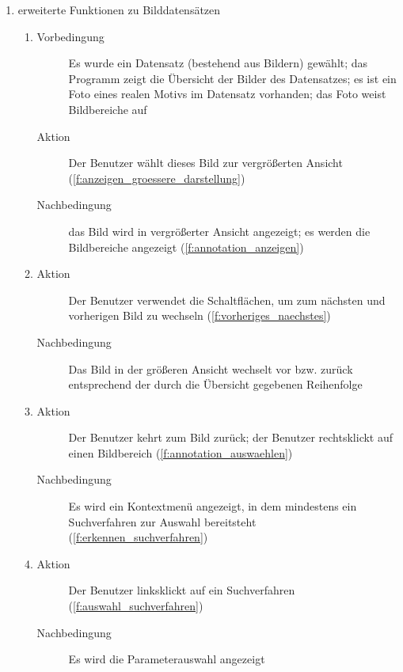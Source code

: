 \begin{enumerate} [label=\bfseries /TS \arabic*0/, leftmargin=*]
	\item erweiterte Funktionen zu Bilddatensätzen \label{ts:erweiterte_Funktionen_zu_Bilddatensätzen}
	\begin{enumerate}[leftmargin=0pt]
		\item
		\begin{description}
			\item[Vorbedingung] Es wurde ein Datensatz (bestehend aus Bildern) gewählt; das Programm zeigt die Übersicht der Bilder des Datensatzes; es ist ein Foto eines realen Motivs im Datensatz vorhanden; das Foto weist  Bildbereiche auf
			\item[Aktion] Der Benutzer wählt dieses Bild zur vergrößerten Ansicht (\ref{f:anzeigen_groessere_darstellung})
			\item[Nachbedingung] das Bild wird in vergrößerter Ansicht angezeigt; es werden die  Bildbereiche angezeigt (\ref{f:annotation_anzeigen})
		\end{description}
		\item
		\begin{description}
			\item[Aktion] Der Benutzer verwendet die Schaltflächen, um zum nächsten und vorherigen Bild zu wechseln (\ref{f:vorheriges_naechstes})
			\item[Nachbedingung] Das Bild in der größeren Ansicht wechselt vor bzw. zurück entsprechend der durch die Übersicht gegebenen Reihenfolge
		\end{description}
		\item
		\begin{description}
			\item[Aktion] Der Benutzer kehrt zum  Bild zurück; der Benutzer rechtsklickt auf einen  Bildbereich (\ref{f:annotation_auswaehlen})
			\item[Nachbedingung] Es wird ein Kontextmenü angezeigt, in dem mindestens ein \gls{Suchverfahren} zur Auswahl bereitsteht (\ref{f:erkennen_suchverfahren})
		\end{description}
		\item
		\begin{description}
			\item[Aktion] Der Benutzer linksklickt auf ein \gls{Suchverfahren} (\ref{f:auswahl_suchverfahren})
			\item[Nachbedingung] Es wird die Parameterauswahl angezeigt
		\end{description}

\end{enumerate}
\end{enumerate}
